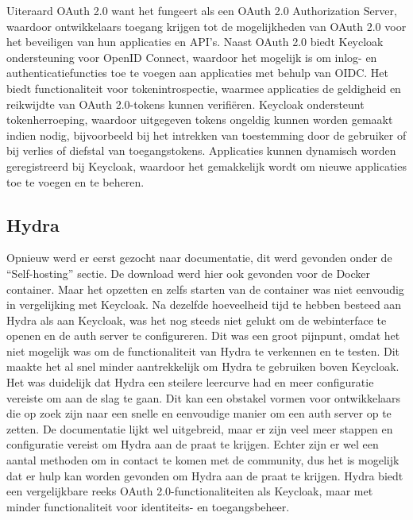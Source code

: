 Uiteraard OAuth 2.0 want het fungeert als een OAuth 2.0 Authorization Server, waardoor ontwikkelaars toegang krijgen tot de mogelijkheden van OAuth 2.0 voor het beveiligen van hun applicaties en API's.
Naast OAuth 2.0 biedt Keycloak ondersteuning voor OpenID Connect, waardoor het mogelijk is om inlog- en authenticatiefuncties toe te voegen aan applicaties met behulp van OIDC.
Het biedt functionaliteit voor tokenintrospectie, waarmee applicaties de geldigheid en reikwijdte van OAuth 2.0-tokens kunnen verifiëren.
Keycloak ondersteunt tokenherroeping, waardoor uitgegeven tokens ongeldig kunnen worden gemaakt indien nodig, bijvoorbeeld bij het intrekken van toestemming door de gebruiker of bij verlies of diefstal van toegangstokens.
Applicaties kunnen dynamisch worden geregistreerd bij Keycloak, waardoor het gemakkelijk wordt om nieuwe applicaties toe te voegen en te beheren.

\subsection{Hydra}%
\label{subsec:hydra}
Opnieuw werd er eerst gezocht naar documentatie, dit werd gevonden onder de ``Self-hosting'' sectie. De download werd hier ook gevonden voor de Docker container.
Maar het opzetten en zelfs starten van de container was niet eenvoudig in vergelijking met Keycloak. Na dezelfde hoeveelheid tijd te hebben besteed aan Hydra als aan Keycloak, was het nog steeds niet gelukt om de webinterface te openen en de auth server te configureren. 
Dit was een groot pijnpunt, omdat het niet mogelijk was om de functionaliteit van Hydra te verkennen en te testen. Dit maakte het al snel minder aantrekkelijk om Hydra te gebruiken boven Keycloak. Het was duidelijk dat Hydra een steilere leercurve had en meer configuratie vereiste om aan de slag te gaan. Dit kan een obstakel vormen voor ontwikkelaars die op zoek zijn naar een snelle en eenvoudige manier om een auth server op te zetten.
De documentatie lijkt wel uitgebreid, maar er zijn veel meer stappen en configuratie vereist om Hydra aan de praat te krijgen. 
Echter zijn er wel een aantal methoden om in contact te komen met de community, dus het is mogelijk dat er hulp kan worden gevonden om Hydra aan de praat te krijgen.
\newline
Hydra biedt een vergelijkbare reeks OAuth 2.0-functionaliteiten als Keycloak, maar met minder functionaliteit voor identiteits- en toegangsbeheer.

